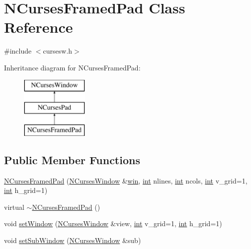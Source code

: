 \hypertarget{class_n_curses_framed_pad}{\section{N\-Curses\-Framed\-Pad Class Reference}
\label{class_n_curses_framed_pad}
}


{\ttfamily \#include $<$cursesw.\-h$>$}

Inheritance diagram for N\-Curses\-Framed\-Pad\-:\begin{figure}[H]
\begin{center}
\leavevmode
\includegraphics[height=3.000000cm]{class_n_curses_framed_pad}
\end{center}
\end{figure}
\subsection*{Public Member Functions}
\begin{DoxyCompactItemize}
\item 
\hyperlink{class_n_curses_framed_pad_ad08cbb1f9e49402ad259868008e5bfa5}{N\-Curses\-Framed\-Pad} (\hyperlink{class_n_curses_window}{N\-Curses\-Window} \&\hyperlink{_ndk_8cpp_a3b51c79a7f111d2be9d347ac9bfe3abd}{win}, \hyperlink{term__entry_8h_ad65b480f8c8270356b45a9890f6499ae}{int} nlines, \hyperlink{term__entry_8h_ad65b480f8c8270356b45a9890f6499ae}{int} ncols, \hyperlink{term__entry_8h_ad65b480f8c8270356b45a9890f6499ae}{int} v\-\_\-grid=1, \hyperlink{term__entry_8h_ad65b480f8c8270356b45a9890f6499ae}{int} h\-\_\-grid=1)
\item 
virtual \hyperlink{class_n_curses_framed_pad_a75fd6659fde8c9297cc7e6ceefb8a8a0}{$\sim$\-N\-Curses\-Framed\-Pad} ()
\item 
void \hyperlink{class_n_curses_framed_pad_a177435ea5253c1b54469c9bf0b5786fc}{set\-Window} (\hyperlink{class_n_curses_window}{N\-Curses\-Window} \&view, \hyperlink{term__entry_8h_ad65b480f8c8270356b45a9890f6499ae}{int} v\-\_\-grid=1, \hyperlink{term__entry_8h_ad65b480f8c8270356b45a9890f6499ae}{int} h\-\_\-grid=1)
\item 
void \hyperlink{class_n_curses_framed_pad_aeed65a75e84ca5393c6e0758dd58d014}{set\-Sub\-Window} (\hyperlink{class_n_curses_window}{N\-Curses\-Window} \&sub)
\end{DoxyCompactItemize}
